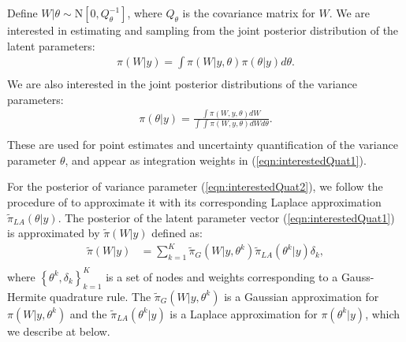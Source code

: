 \documentclass[ba]{imsart}
\begin{document}
Define $W|\theta\sim\text{N}\left[ 0,Q^{-1}_{\theta}\right]$, where $Q_{\theta}$ is the covariance matrix for $W$. 
We are interested in estimating and sampling from the joint posterior distribution of the latent parameters:
\begin{equation}\begin{aligned}\label{eqn:interestedQuat1}
\pi(W|y) = \int \pi(W|y,\theta) \pi(\theta|y) d\theta .  \\
\end{aligned}\end{equation}
We are also interested in the joint posterior distributions of the variance parameters:
\begin{equation}\begin{aligned}\label{eqn:interestedQuat2}
\pi(\theta|y) = \frac{\int \pi(W,y,\theta) dW}{\int_{} \int_{} \pi(W,y,\theta) dW d\theta } . \\
\end{aligned}\end{equation}
These are used for point estimates and uncertainty quantification of the variance parameter $\theta$, and appear as integration weights in (\ref{eqn:interestedQuat1}). 

For the posterior of variance parameter (\ref{eqn:interestedQuat2}), we follow the procedure of \cite{casecross} to approximate it with its corresponding Laplace approximation $\tilde{\pi}_{LA}(\theta|y)$. The posterior of the latent parameter vector (\ref{eqn:interestedQuat1}) is approximated by $\tilde{\pi}(W|y)$ defined as:
\begin{equation}\begin{aligned}\label{eqn:integration}
\tilde{\pi}(W|y) &= \sum_{k=1}^{K}
\tilde{\pi}_{G}(W|y,\theta^{k})
\tilde{\pi}_{LA}(\theta^{k}|y)\delta_{k} , \\
\end{aligned}\end{equation}
where $\left\{\theta^{k},\delta_{k}\right\}_{k=1}^{K}$ is a set of nodes and weights corresponding to a Gauss-Hermite quadrature rule. The $\tilde{\pi}_{G}(W|y,\theta^{k})$ is a Gaussian approximation for $\pi(W|y,\theta^{k})$ and the $\tilde{\pi}_{LA}(\theta^{k}|y)$ is a Laplace approximation for $\pi(\theta^{k}|y)$, which we describe at below.
\end{document}
